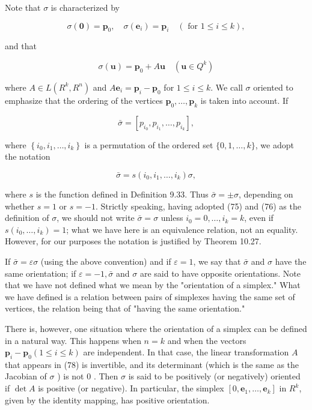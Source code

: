 \documentclass[10pt]{article}
\begin{document}
Note that $\sigma$ is characterized by

$$
\sigma(\mathbf{0})=\mathbf{p}_{0}, \quad \sigma\left(\mathbf{e}_{i}\right)=\mathbf{p}_{i} \quad(\text { for } 1 \leq i \leq k),
$$

and that

$$
\sigma(\mathbf{u})=\mathbf{p}_{0}+A \mathbf{u} \quad\left(\mathbf{u} \in Q^{k}\right)
$$

where $A \in L\left(R^{k}, R^{n}\right)$ and $A \mathbf{e}_{i}=\mathbf{p}_{i}-\mathbf{p}_{0}$ for $1 \leq i \leq k$. We call $\sigma$ oriented to emphasize that the ordering of the vertices $\mathbf{p}_{0}, \ldots, \mathbf{p}_{k}$ is taken into account. If

$$
\bar{\sigma}=\left[p_{i_{0}}, p_{i_{1}}, \ldots, p_{i_{k}}\right],
$$

where $\left\{i_{0}, i_{1}, \ldots, i_{k}\right\}$ is a permutation of the ordered set $\{0,1, \ldots, k\}$, we adopt the notation

$$
\bar{\sigma}=s\left(i_{0}, i_{1}, \ldots, i_{k}\right) \sigma,
$$

where $s$ is the function defined in Definition 9.33. Thus $\bar{\sigma}= \pm \sigma$, depending on whether $s=1$ or $s=-1$. Strictly speaking, having adopted (75) and (76) as the definition of $\sigma$, we should not write $\bar{\sigma}=\sigma$ unless $i_{0}=0, \ldots, i_{k}=k$, even if $s\left(i_{0}, \ldots, i_{k}\right)=1$; what we have here is an equivalence relation, not an equality. However, for our purposes the notation is justified by Theorem 10.27.

If $\bar{\sigma}=\varepsilon \sigma$ (using the above convention) and if $\varepsilon=1$, we say that $\bar{\sigma}$ and $\sigma$ have the same orientation; if $\varepsilon=-1, \bar{\sigma}$ and $\sigma$ are said to have opposite orientations. Note that we have not defined what we mean by the "orientation of a simplex." What we have defined is a relation between pairs of simplexes having the same set of vertices, the relation being that of "having the same orientation."

There is, however, one situation where the orientation of a simplex can be defined in a natural way. This happens when $n=k$ and when the vectors $\mathbf{p}_{i}-\mathbf{p}_{0}(1 \leq i \leq k)$ are independent. In that case, the linear transformation $A$ that appears in (78) is invertible, and its determinant (which is the same as the Jacobian of $\sigma$ ) is not 0 . Then $\sigma$ is said to be positively (or negatively) oriented if $\operatorname{det} A$ is positive (or negative). In particular, the simplex $\left[0, \mathbf{e}_{1}, \ldots, \mathbf{e}_{k}\right]$ in $R^{k}$, given by the identity mapping, has positive orientation.
\end{document}
